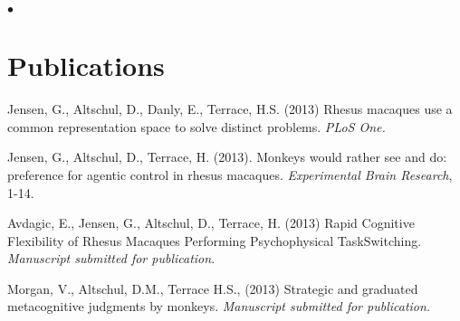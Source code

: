 \documentclass[margin,line]{res}
\newenvironment{list2}{
  \begin{list}{$\bullet$}{%
      \setlength{\itemsep}{0in}
      \setlength{\parsep}{0in} \setlength{\parskip}{0in}
      \setlength{\topsep}{0in} \setlength{\partopsep}{0in} 
      \setlength{\leftmargin}{0.2in}}}{\end{list}}
\begin{document}
\begin{resume}
\begin{list2}
\vspace{.3cm}
\end{list2}

\section{\sc Publications} 

Jensen, G., Altschul, D., Danly, E., Terrace, H.S. (2013) Rhesus macaques use a common representation space to solve distinct problems. {\it PLoS One.}

Jensen, G., Altschul, D., Terrace, H. (2013). Monkeys would rather see and do: preference for agentic control in rhesus macaques. {\it Experimental Brain Research}, 1-14.

Avdagic, E., Jensen, G., Altschul, D., Terrace, H. (2013) Rapid Cognitive Flexibility of Rhesus Macaques Performing Psychophysical TaskSwitching. {\it Manuscript submitted for publication.}

Morgan, V., Altschul, D.M., Terrace H.S., (2013) Strategic and graduated metacognitive judgments by monkeys.  {\it Manuscript submitted for publication.}



\end{resume}
\end{document}
